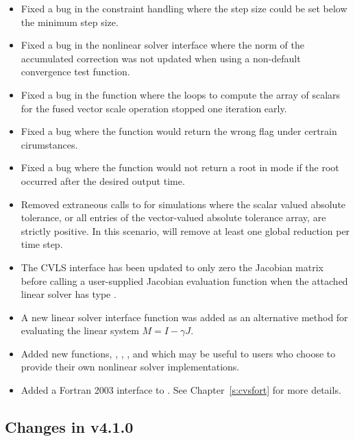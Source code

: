 \begin{itemize}
\item Fixed a bug in the {\cvodes} constraint handling where the step size could be
set below the minimum step size.
%
\item Fixed a bug in the {\cvodes} nonlinear solver interface where the norm of the
accumulated correction was not updated when using a non-default convergence
test function.
%
\item Fixed a bug in the {\cvodes}  function where the loops to compute
the array of scalars for the fused vector scale operation stopped one iteration
early.
%
\item Fixed a bug where the  function would return the wrong flag under
certrain cirumstances.
%
\item Fixed a bug where the  function would not return a root in
 mode if the root occurred after the desired output time.
%
\item Removed extraneous calls to  for simulations where the scalar valued
absolute tolerance, or all entries of the vector-valued absolute tolerance
array, are strictly positive.  In this scenario, {\cvodes} will remove at least
one global reduction per time step.
%
\item The CVLS interface has been updated to only zero the Jacobian matrix before
calling a user-supplied Jacobian evaluation function when the attached linear
solver has type \newline\noindent
{}.
%
\item A new linear solver interface function  was added as an
alternative method for evaluating the linear system $M = I - \gamma J$.
%
\item Added new functions,
,
, \newline\noindent
{}, and
which may be useful to users who choose to provide their own nonlinear solver
implementations.
%
\item Added a Fortran 2003 interface to {\cvodes}. See Chapter~\ref{s:cvsfort}
for more details.
\end{itemize}



\subsection*{Changes in v4.1.0}

